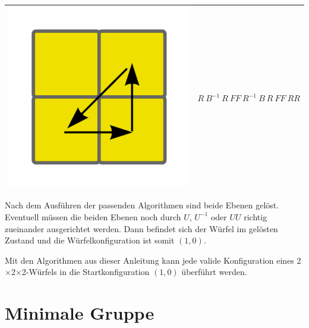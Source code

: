 \documentclass[12pt,a4paper, usenames, dvipsnames]{article}
\theoremstyle{mystyle}
\theoremstyle{definition}
\newcommand{\Ttwo}{2$\times$2$\times$2-}
\begin{document}
\begin{center}
\begin{tabular}{m{4cm} m{8cm}}
\includegraphics[scale=0.08]{corners3.png}   & $R \ B^{-1} \ R \ FF \ R^{-1} \ B \ R \ FF \ RR $ \\
\bottomrule
\end{tabular}
\end{center}
%
%

Nach dem Ausführen der passenden Algorithmen sind beide Ebenen gelöst. Eventuell müssen die beiden Ebenen noch durch $U$, $U^{-1}$ oder $UU$ richtig zueinander ausgerichtet werden. Dann befindet sich der Würfel im gelösten Zustand und die Würfelkonfiguration ist somit $(1,0)$.

Mit den Algorithmen aus dieser Anleitung kann jede valide Konfiguration eines \Ttwo Würfels in die Startkonfiguration $(1,0)$ überführt werden.

%
%
%
%
%
%
%
%
%
%
%
%
%
%
%
%
%
%
%
%
\newpage

\section{Minimale Gruppe}
\label{Kapitel_MinUntergruppe}
\end{document}

